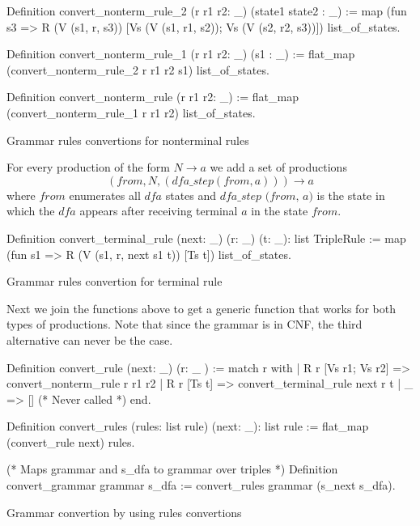 \begin{listing}[h]
    \begin{pyglist}[language=coq, numbers=none, numbersep=5pt]
  Definition convert_nonterm_rule_2 
    (r r1 r2: _) 
    (state1 state2 : _) :=
    map (fun s3 => R (V (s1, r, s3)) 
                     [Vs (V (s1, r1, s2)); 
                      Vs (V (s2, r2, s3))])
      list_of_states.

  Definition convert_nonterm_rule_1  
               (r r1 r2: _) 
               (s1 : _) :=
    flat_map (convert_nonterm_rule_2 r r1 r2 s1) 
             list_of_states.

  Definition convert_nonterm_rule (r r1 r2: _) :=
    flat_map (convert_nonterm_rule_1 r r1 r2) 
             list_of_states.
    \end{pyglist}
    \caption{Grammar rules convertions for nonterminal rules}
    \label{lst:verbments1}
\end{listing}

For every production of the form $N \to a$ we add a set of productions $$(\textit{from}, N, (\textit{dfa\_step}(\textit{from}, a))) \to a$$ where $\textit{from}$ enumerates all $\textit{dfa}$ states and $\textit{dfa\_step (from, a)}$ is the state in which the $\textit{dfa}$ appears after receiving terminal $a$ in the state $\textit{from}$.

\begin{listing}[h]
    \begin{pyglist}[language=coq, numbers=none, numbersep=5pt]
  Definition convert_terminal_rule 
              (next: _) 
              (r: _) 
              (t: _): list TripleRule :=
    map (fun s1 => R (V (s1, r, next s1 t)) 
	               [Ts t]) 
        list_of_states.
    \end{pyglist}
    \caption{Grammar rules convertion for terminal rule}
    \label{lst:verbments1}
\end{listing}

Next we join the functions above to get a generic function that works for both types of productions. 
Note that since the grammar is in CNF, the third alternative can never be the case.

\begin{listing}[h]
    \begin{pyglist}[language=coq, numbers=none, numbersep=5pt]
  Definition convert_rule (next: _) (r: _ ) :=
    match r with
    | R r [Vs r1; Vs r2] => 
        convert_nonterm_rule r r1 r2
    | R r [Ts t] => 
        convert_terminal_rule next r t 
    | _  => []   (* Never called *)
    end.
        
  Definition convert_rules 
    (rules: list rule) (next: _): list rule :=
    flat_map (convert_rule next) rules.
    
  (* Maps grammar and s_dfa 
     to grammar over triples *)
  Definition convert_grammar grammar s_dfa :=
    convert_rules grammar (s_next s_dfa). 
    \end{pyglist}
    \caption{Grammar convertion by using rules convertions}
    \label{lst:verbments1}
\end{listing}

